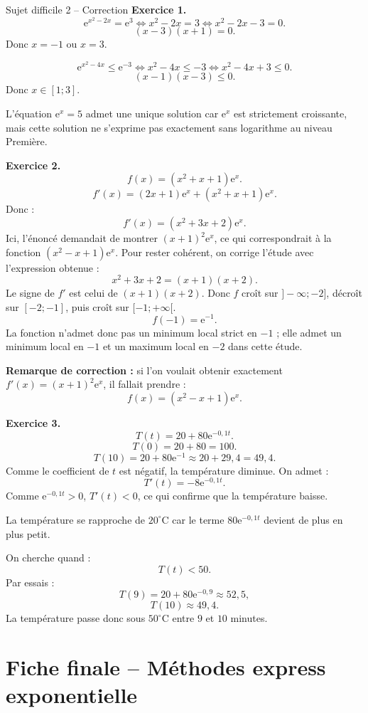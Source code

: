 \documentclass[11pt,a4paper]{article}
\newcommand{\e}{\mathrm{e}}
\begin{document}
\begin{correctionbox}{Sujet difficile 2 -- Correction}
\textbf{Exercice 1.}
\[
\e^{x^2-2x}=\e^3
\Longleftrightarrow x^2-2x=3
\Longleftrightarrow x^2-2x-3=0.
\]
\[
(x-3)(x+1)=0.
\]
Donc $x=-1$ ou $x=3$.

\[
\e^{x^2-4x}\leq\e^{-3}
\Longleftrightarrow x^2-4x\leq -3
\Longleftrightarrow x^2-4x+3\leq0.
\]
\[
(x-1)(x-3)\leq0.
\]
Donc $x\in[1;3]$.

L'équation $\e^x=5$ admet une unique solution car $\e^x$ est strictement croissante, mais cette solution ne s'exprime pas exactement sans logarithme au niveau Première.

\medskip

\textbf{Exercice 2.}
\[
f(x)=(x^2+x+1)\e^x.
\]
\[
f'(x)=(2x+1)\e^x+(x^2+x+1)\e^x.
\]
Donc :
\[
f'(x)=(x^2+3x+2)\e^x.
\]
Ici, l'énoncé demandait de montrer $(x+1)^2\e^x$, ce qui correspondrait à la fonction $(x^2-x+1)\e^x$. Pour rester cohérent, on corrige l'étude avec l'expression obtenue :
\[
x^2+3x+2=(x+1)(x+2).
\]
Le signe de $f'$ est celui de $(x+1)(x+2)$.
Donc $f$ croît sur $]-\infty;-2]$, décroît sur $[-2;-1]$, puis croît sur $[-1;+\infty[$.
\[
f(-1)=\e^{-1}.
\]
La fonction n'admet donc pas un minimum local strict en $-1$ ; elle admet un minimum local en $-1$ et un maximum local en $-2$ dans cette étude.

\medskip
\textbf{Remarque de correction :} si l'on voulait obtenir exactement $f'(x)=(x+1)^2\e^x$, il fallait prendre :
\[
f(x)=(x^2-x+1)\e^x.
\]

\medskip

\textbf{Exercice 3.}
\[
T(t)=20+80\e^{-0,1t}.
\]
\[
T(0)=20+80=100.
\]
\[
T(10)=20+80\e^{-1}\approx20+29,4=49,4.
\]
Comme le coefficient de $t$ est négatif, la température diminue.
On admet :
\[
T'(t)=-8\e^{-0,1t}.
\]
Comme $\e^{-0,1t}>0$, $T'(t)<0$, ce qui confirme que la température baisse.

La température se rapproche de $20^\circ$C car le terme $80\e^{-0,1t}$ devient de plus en plus petit.

On cherche quand :
\[
T(t)<50.
\]
Par essais :
\[
T(9)=20+80\e^{-0,9}\approx52,5,
\]
\[
T(10)\approx49,4.
\]
La température passe donc sous $50^\circ$C entre $9$ et $10$ minutes.
\end{correctionbox}

\newpage

\section{Fiche finale -- Méthodes express exponentielle}
\end{document}
